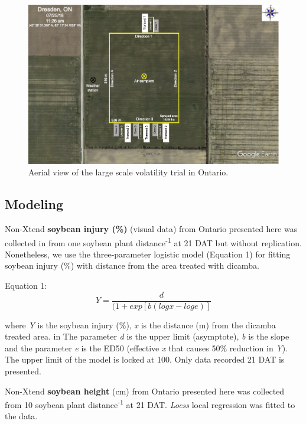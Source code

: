\documentclass[]{article}
\begin{document}
\begin{figure}[h]

{\centering \includegraphics[width=1\linewidth]{Ontario} 

}

\caption{Aerial view of the large scale volatility trial in Ontario.}\label{fig:unnamed-chunk-80}
\end{figure}

\pagebreak

\subsection{Modeling}\label{modeling-4}

Non-Xtend \textbf{soybean injury (\%)} (visual data) from Ontario
presented here was collected in from one soybean plant
distance\textsuperscript{-1} at 21 DAT but without replication.
Nonetheless, we use the three-parameter logistic model (Equation 1) for
fitting soybean injury (\%) with distance from the area treated with
dicamba.

Equation 1: \[Y= \frac{d}{(1 + exp[b(logx - loge)]} \]

where \emph{Y} is the soybean injury (\%), \emph{x} is the distance (m)
from the dicamba treated area. in The parameter \emph{d} is the upper
limit (asymptote), \emph{b} is the slope and the parameter \emph{e} is
the ED50 (effective \emph{x} that causes 50\% reduction in \emph{Y}).
The upper limit of the model is locked at 100. Only data recorded 21 DAT
is presented.

Non-Xtend \textbf{soybean height} (cm) from Ontario presented here was
collected from 10 soybean plant distance\textsuperscript{-1} at 21 DAT.
\emph{Loess} local regression was fitted to the data.
\end{document}
